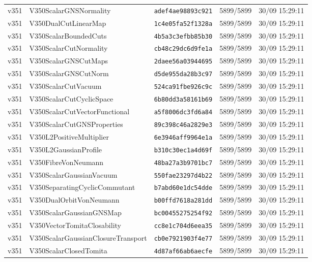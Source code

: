 \documentclass[11pt]{article}
\theoremstyle{definition}\newtheorem{deriv}{Derivation}
\begin{document}
{\begin{longtable}{@{}lllll@{}}
v351 & V350ScalarGNSNormality & \texttt{adef4ae98893c921} & 5899/5899 & 30/09 15:29:11 \\
v351 & V350DualCutLinearMap & \texttt{1c4e05fa52f1328a} & 5899/5899 & 30/09 15:29:11 \\
v351 & V350ScalarBoundedCuts & \texttt{4b5a3c3efbb85b30} & 5899/5899 & 30/09 15:29:11 \\
v351 & V350ScalarCutNormality & \texttt{cb48c29dc6d9fe1a} & 5899/5899 & 30/09 15:29:11 \\
v351 & V350ScalarGNSCutMaps & \texttt{2daee56a03944695} & 5899/5899 & 30/09 15:29:11 \\
v351 & V350ScalarGNSCutNorm & \texttt{d5de955da28b3c97} & 5899/5899 & 30/09 15:29:11 \\
v351 & V350ScalarCutVacuum & \texttt{524ca91fbe926c9c} & 5899/5899 & 30/09 15:29:11 \\
v351 & V350ScalarCutCyclicSpace & \texttt{6b80dd3a58161b69} & 5899/5899 & 30/09 15:29:11 \\
v351 & V350ScalarCutVectorFunctional & \texttt{a5f8006dc3fd6a84} & 5899/5899 & 30/09 15:29:11 \\
v351 & V350ScalarCutGNSProperties & \texttt{89c398c46a2829e3} & 5899/5899 & 30/09 15:29:11 \\
v351 & V350L2PositiveMultiplier & \texttt{6e3946aff9964e1a} & 5899/5899 & 30/09 15:29:11 \\
v351 & V350L2GaussianProfile & \texttt{b310c30ec1a4d69f} & 5899/5899 & 30/09 15:29:11 \\
v351 & V350FibreVonNeumann & \texttt{48ba27a3b9701bc7} & 5899/5899 & 30/09 15:29:11 \\
v351 & V350ScalarGaussianVacuum & \texttt{550fae23297d4b22} & 5899/5899 & 30/09 15:29:11 \\
v351 & V350SeparatingCyclicCommutant & \texttt{b7abd60e1dc54dde} & 5899/5899 & 30/09 15:29:11 \\
v351 & V350DualOrbitVonNeumann & \texttt{b00ffd7618a281dd} & 5899/5899 & 30/09 15:29:11 \\
v351 & V350ScalarGaussianGNSMap & \texttt{bc00455275254f92} & 5899/5899 & 30/09 15:29:11 \\
v351 & V350VectorTomitaClosability & \texttt{cc8e1c704d6eea35} & 5899/5899 & 30/09 15:29:11 \\
v351 & V350ScalarGaussianClosureTransport & \texttt{cb0e7921903f4e77} & 5899/5899 & 30/09 15:29:11 \\
v351 & V350ScalarClosedTomita & \texttt{4d87af66ab6aecfe} & 5899/5899 & 30/09 15:29:11 \\

\end{longtable}}
\end{document}
